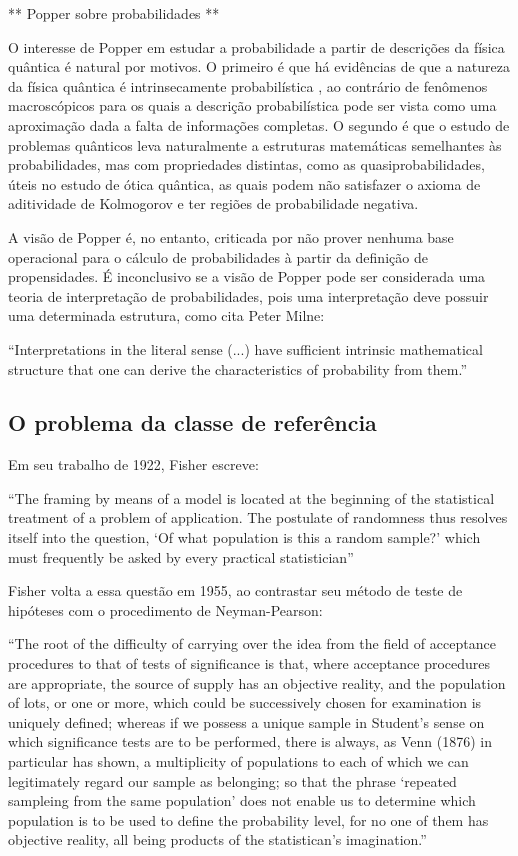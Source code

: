 \documentclass[12pt,a4paper]{article}
\begin{document}
	** Popper sobre probabilidades **

O interesse de Popper em estudar a probabilidade a partir de descrições da física quântica é natural por motivos. O primeiro
é que há evidências de que a natureza da física quântica é intrinsecamente probabilística \cite{???}, ao contrário de fenômenos
macroscópicos para os quais a descrição probabilística pode ser vista como uma aproximação dada a falta de informações completas.
O segundo é que o estudo de problemas quânticos leva naturalmente a estruturas matemáticas semelhantes às probabilidades, mas
com	propriedades distintas, como as quasiprobabilidades, úteis no estudo de ótica quântica, as quais podem não satisfazer o
axioma de aditividade de Kolmogorov e ter regiões de probabilidade negativa\cite{Mandel95}.

A visão de Popper é, no entanto, criticada por não prover nenhuma base operacional para o cálculo de probabilidades à partir
da definição de propensidades. É inconclusivo se a visão de Popper pode ser considerada uma teoria de interpretação
de probabilidades, pois uma interpretação deve possuir uma determinada estrutura, como cita Peter Milne:

``Interpretations in the literal sense (...) have sufficient intrinsic mathematical structure that one can derive
the characteristics of probability from them.''\cite{Milne93}

\subsection{O problema da classe de referência}\label{sec:classref}

Em seu trabalho de 1922, Fisher escreve:

``The framing by means of a model is located at the beginning of the
statistical treatment of a problem of application. The postulate of randomness thus resolves itself into the 
question, `Of what population is this a random sample?' which must frequently be asked by every practical
statistician''\cite{Fisher1922}

Fisher volta a essa questão em 1955, ao contrastar seu método de teste de hipóteses com o procedimento de Neyman-Pearson:

``The root of the difficulty of carrying over the idea from the field of acceptance procedures to that of tests of significance
is that, where acceptance procedures are appropriate, the source of supply has an objective reality, and the population
of lots, or one or more, which could be successively chosen for examination is uniquely defined; whereas if we possess a unique
sample in Student's sense on which significance tests are to be performed, there is always, as Venn (1876) in particular has
shown, a multiplicity of populations to each of which we can legitimately regard our sample as belonging; so that the phrase
`repeated sampleing from the same population' does not enable us to determine which population is to be used to define the
probability level, for no one of them has objective reality, all being products of the statistican's imagination.''
\cite{Fisher1955}
\end{document}
